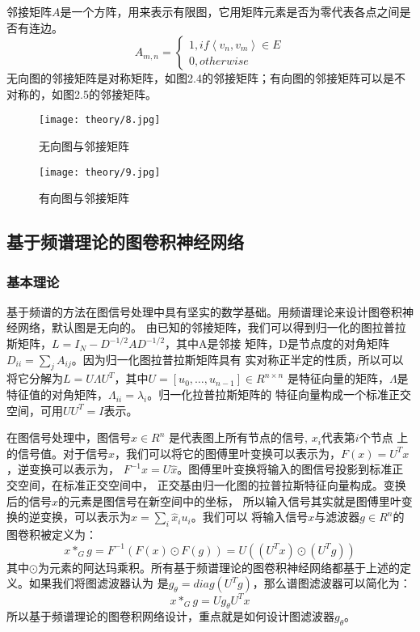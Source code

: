 邻接矩阵$A$是一个方阵，用来表示有限图，它用矩阵元素是否为零代表各点之间是否有连边。
\begin{equation}
    A_{m,n} = 
    \begin{cases}1,if\left \langle v_{n}, v_{m} \right \rangle  \in E
    \\
    0,otherwise
    \end{cases}
\end{equation}
无向图的邻接矩阵是对称矩阵，如图2.4的邻接矩阵；有向图的邻接矩阵可以是不对称的，如图2.5的邻接矩阵。
\begin{figure}[htbp]
    \centering
    \begin{minipage}[t]{0.48\textwidth}
    \centering
    \captionsetup{width=5cm}
    \texttt{[image: theory/8.jpg]}
    \caption{\label{2-8}无向图与邻接矩阵}
    \end{minipage}
    \begin{minipage}[t]{0.48\textwidth}
    \centering
    \captionsetup{width=5cm}
    \texttt{[image: theory/9.jpg]}
    \caption{\label{2-9}有向图与邻接矩阵}
    \end{minipage}
\end{figure}

\subsection{基于频谱理论的图卷积神经网络}
\subsubsection{基本理论}
基于频谱的方法在图信号处理中具有坚实的数学基础。用频谱理论来设计图卷积神经网络，默认图是无向的。
由已知的邻接矩阵，我们可以得到归一化的图拉普拉斯矩阵，$ L=I_N-D^{-1/2}AD^{-1/2} $，其中A是邻接
矩阵，D是节点度的对角矩阵 $ D_{ii}={\sum_{j}} A_{ij} $。因为归一化图拉普拉斯矩阵具有
实对称正半定的性质，所以可以将它分解为$ L=U\Lambda U^T $，其中$ U=[u_0,\ldots,u_{n-1}]∈R^{n×n} $
是特征向量的矩阵，$ \Lambda $是特征值的对角矩阵，$\Lambda_{ii}=\lambda_{i} $。归一化拉普拉斯矩阵的
特征向量构成一个标准正交空间，可用$ UU^{T}=I $表示。

在图信号处理中，图信号$ x\in R^n $ 是代表图上所有节点的信号, $ x_i $代表第$ i $个节点
上的信号值。对于信号$ x $，我们可以将它的图傅里叶变换可以表示为，$ F(x)=U^{T}x $，逆变换可以表示为，
$ F^{-1} \widehat{x} = U\widehat{x} $。图傅里叶变换将输入的图信号投影到标准正交空间，在标准正交空间中，
正交基由归一化图的拉普拉斯特征向量构成。变换后的信号$ \widehat{x} $的元素是图信号在新空间中的坐标，
所以输入信号其实就是图傅里叶变换的逆变换，可以表示为$ x = {\sum_{i}}\widehat{x}_{i}u_{i} $。我们可以
将输入信号$ x $与滤波器$ g \in R^{n} $的图卷积被定义为：
$$ x\ast_{G}g = F^{-1}(F(x) \odot F(g)) = U((U^{T}x) \odot (U^{T}g)) $$
其中$ \odot $为元素的阿达玛乘积。所有基于频谱理论的图卷积神经网络都基于上述的定义。如果我们将图滤波器认为
是$ g_{\theta}=diag(U^{T}g) $，那么谱图滤波器可以简化为：
$$ x\ast_{G}g = U g_{\theta} U^{T} x $$
所以基于频谱理论的图卷积网络设计，重点就是如何设计图滤波器$ g_{\theta} $。

